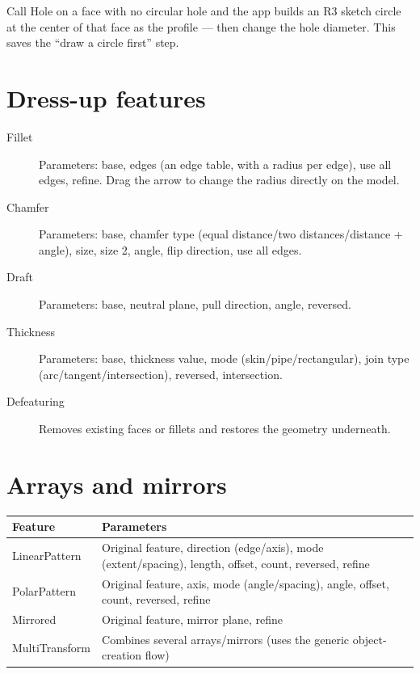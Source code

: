 \begin{tip}
Call Hole on a face with no circular hole and the app builds an R3 sketch circle at the center of that face as the
profile --- then change the hole diameter. This saves the ``draw a circle first'' step.
\end{tip}

\section{Dress-up features}

\begin{description}
  \item[Fillet] Parameters: base, edges (an edge table, with a radius per edge), use all edges, refine. Drag the arrow to change the radius directly on the model.
  \item[Chamfer] Parameters: base, chamfer type (equal distance/two distances/distance + angle), size, size 2, angle, flip direction, use all edges.
  \item[Draft] Parameters: base, neutral plane, pull direction, angle, reversed.
  \item[Thickness] Parameters: base, thickness value, mode (skin/pipe/rectangular), join type (arc/tangent/intersection), reversed, intersection.
  \item[Defeaturing] Removes existing faces or fillets and restores the geometry underneath.
\end{description}


\section{Arrays and mirrors}

\begin{center}
\small
\begin{tabularx}{\linewidth}{@{}lX@{}}
\toprule
\textbf{Feature} & \textbf{Parameters} \\
\midrule
LinearPattern & Original feature, direction (edge/axis), mode (extent/spacing), length, offset, count, reversed, refine \\
PolarPattern & Original feature, axis, mode (angle/spacing), angle, offset, count, reversed, refine \\
Mirrored & Original feature, mirror plane, refine \\
MultiTransform & Combines several arrays/mirrors (uses the generic object-creation flow)\\
\bottomrule
\end{tabularx}
\end{center}

